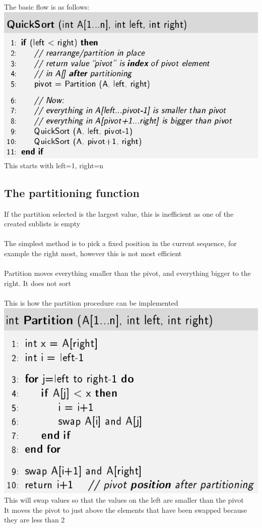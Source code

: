 \documentclass{article}[18pt]
\begin{document}
The basic flow is as follows:\\
\includegraphics[scale=0.7]{QS}\\
This starts with left=1, right=n
\subsection{The partitioning function}
If the partition selected is the largest value, this is inefficient as one of the created sublists is empty\\
\\
The simplest method is to pick a fixed position in the current sequence, for example the right most, however this is not most efficient\\
\\
Partition moves everything smaller than the pivot, and everything bigger to the right. It does not sort\\
\\
This is how the partition procedure can be implemented\\
\includegraphics[scale=0.7]{partition}\\
This will swap values so that the values on the left are smaller than the pivot\\
It moves the pivot to just above the elements that have been swapped because they are less than 2
\end{document}
